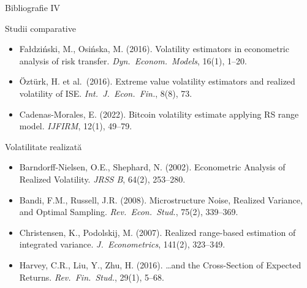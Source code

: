 \documentclass[9pt, aspectratio=169, t]{beamer}
\theoremstyle{definition}
\newenvironment{cminipage}[1]{%
    \par\noindent\hfill\begin{minipage}{#1}\ignorespaces
}{%
    \end{minipage}\hfill\null\par
}
\begin{document}
\begin{frame}[shrink=5]{Bibliografie IV}
    \vspace{-0.3cm}
    \begin{cminipage}{0.95\textwidth}
    \begin{block}{Studii comparative}
        {\footnotesize
        \begin{itemize}\setlength{\itemsep}{0pt}\setlength{\parsep}{0pt}\setlength{\topsep}{0pt}
            \item Fa{\l}dzi\'{n}ski, M., Osi\'{n}ska, M. (2016). Volatility estimators in econometric analysis of risk transfer. \textit{Dyn.\ Econom.\ Models}, 16(1), 1--20.
            \item \"{O}zt\"{u}rk, H. et al.\ (2016). Extreme value volatility estimators and realized volatility of ISE. \textit{Int.\ J.\ Econ.\ Fin.}, 8(8), 73.
            \item Cadenas-Morales, E. (2022). Bitcoin volatility estimate applying RS range model. \textit{IJFIRM}, 12(1), 49--79.
        \end{itemize}
        }
    \end{block}

    \begin{exampleblock}{Volatilitate realizată}
        {\footnotesize
        \begin{itemize}\setlength{\itemsep}{0pt}\setlength{\parsep}{0pt}\setlength{\topsep}{0pt}
            \item Barndorff-Nielsen, O.E., Shephard, N. (2002). Econometric Analysis of Realized Volatility. \textit{JRSS B}, 64(2), 253--280.
            \item Bandi, F.M., Russell, J.R. (2008). Microstructure Noise, Realized Variance, and Optimal Sampling. \textit{Rev.\ Econ.\ Stud.}, 75(2), 339--369.
            \item Christensen, K., Podolskij, M. (2007). Realized range-based estimation of integrated variance. \textit{J.\ Econometrics}, 141(2), 323--349.
            \item Harvey, C.R., Liu, Y., Zhu, H. (2016). \ldots and the Cross-Section of Expected Returns. \textit{Rev.\ Fin.\ Stud.}, 29(1), 5--68.
        \end{itemize}
        }
    \end{exampleblock}
    \end{cminipage}
\end{frame}
\end{document}
